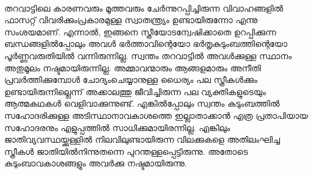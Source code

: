 \paragraph{}തറവാട്ടിലെ കാരണവരും മൂത്തവരും ചേർന്നുറപ്പിച്ചിരുന്ന വിവാഹങ്ങളിൽ ഫാസറ്റ് വിവരിക്കുംപ്രകാരമുള്ള സ്വാതന്ത്ര്യം ഉണ്ടായിരുന്നോ എന്നു സംശയമാണ്. എന്നാൽ, ഇങ്ങനെ സ്ത്രീയോടന്വേഷിക്കാതെ ഉറപ്പിക്കുന്ന ബന്ധങ്ങളിൽപ്പോലും അവൾ ഭർത്താവിന്റെയോ ഭർതൃകുടുംബത്തിന്റെയോ പൂർണ്ണവരുതിയിൽ വന്നിരുന്നില്ല. സ്വന്തം തറവാട്ടിൽ അവൾക്കുള്ള സ്ഥാനം അതുമൂലം നഷ്ടമായിരുന്നില്ല. അമ്മാവന്മാരും ആങ്ങളമാരും അനീതി പ്രവർത്തിക്കുമ്പോൾ ചോദ്യംചെയ്യാനുള്ള ധൈര്യം പല സ്ത്രീകൾക്കും ഉണ്ടായിരുന്നില്ലെന്ന് അക്കാലത്തു ജീവിച്ചിരുന്ന പല വ്യക്തികളുടെയും ആത്മകഥകൾ വെളിവാക്കുന്നുണ്ട്. എങ്കിൽപ്പോലും സ്വന്തം കുടുംബത്തിൽ സഹോദരിക്കുള്ള അടിസ്ഥാനാവകാശത്തെ ഇല്ലാതാക്കാൻ എത്ര പ്രതാപിയായ സഹോദരനും എളുപ്പത്തിൽ സാധിക്കുമായിരന്നില്ല. എങ്കിലും ജാതിവ്യവസ്ഥയ്ക്കുള്ളിൽ നിലവിലുണ്ടായിരുന്ന വിലക്കുകളെ അതിലംഘിച്ച സ്ത്രീകൾ ജാതിയിൽനിന്നുതന്നെ പുറന്തള്ളപ്പെട്ടിരുന്നു. അതോടെ കുടുംബാവകാശങ്ങളും അവർക്കു നഷ്ടമായിരുന്നു.

